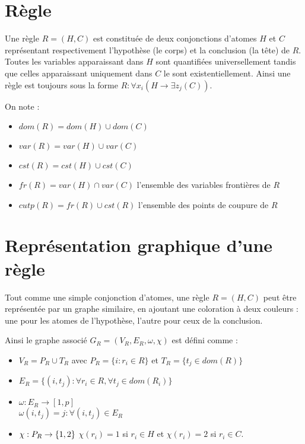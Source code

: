 
\section{R\`egle}\label{def_regle}
Une règle $R = (H,C)$ est constituée de deux conjonctions d'atomes $H$ et $C$ représentant
respectivement l'hypothèse (le corps) et la conclusion (la tête) de $R$.
Toutes les variables apparaissant dans $H$ sont quantifiées universellement tandis que
celles apparaissant uniquement dans $C$ le sont existentiellement.
Ainsi une règle est toujours sous la forme 
$R : \forall x_i (H \rightarrow \exists z_j (C))$.

On note :
\begin{itemize}
	\item $dom(R) = dom(H) \cup dom(C)$
	\item $var(R) = var(H) \cup var(C)$
	\item $cst(R) = cst(H) \cup cst(C)$
	\item $fr(R) = var(H) \cap var(C)$ l'ensemble des variables fronti\`eres de $R$
	\item $cutp(R) = fr(R) \cup cst(R)$ l'ensemble des points de coupure de $R$
\end{itemize}

\section{Représentation graphique d'une règle}
\label{def_representation_regle}
Tout comme une simple conjonction d'atomes, une règle $R = (H,C)$ peut être représentée
par un graphe similaire, en ajoutant une coloration à deux couleurs : une pour les atomes de
l'hypothèse, l'autre pour ceux de la conclusion.

Ainsi le graphe associé $G_R = (V_R,E_R,\omega,\chi)$ est défini comme :
\begin{itemize}
	\item 
		$V_{R} = P_R \cup T_{R}$ avec $P_R = \{i : r_{i} \in R\}$ et $T_{R} = 
		\{t_{j} \in dom(R)\}$
	\item 
		$E_{R} = \{(i,t_{j}) : \forall r_{i} \in R, \forall t_{j} \in dom(R_{i})\}$
	\item 
		$\omega : E_R \rightarrow [1,p]$\\
		$\omega(i,t_{j}) = j : \forall (i,t_{j}) \in E_{R}$
	\item 
		$\chi : P_R \rightarrow \{1,2\}\\$
		$\chi(r_i) = 1$ si $r_i \in H$ et $\chi(r_i) = 2$ si $r_i \in C$.
\end{itemize}

